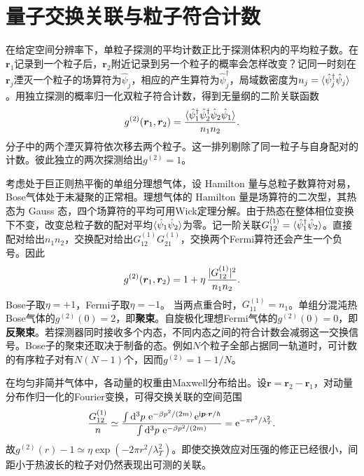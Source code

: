\section{量子交换关联与粒子符合计数}
\label{sec:exchange-correlations}

在给定空间分辨率下，单粒子探测的平均计数正比于探测体积内的平均粒子数。在$\bm r_1$记录到一个粒子后，$\bm r_2$附近记录到另一个粒子的概率会怎样改变？记同一时刻在$\bm r_j$湮灭一个粒子的场算符为$\hat\psi_j$，相应的产生算符为$\hat\psi_j^\dagger$，局域数密度为$n_j = \langle\hat\psi_j^\dagger\hat\psi_j\rangle$。用独立探测的概率归一化双粒子符合计数，得到无量纲的二阶关联函数
\begin{equation}
	g^{(2)}(\bm r_1,\bm r_2) =
	\frac{\langle\hat\psi_1^\dagger\hat\psi_2^\dagger\hat\psi_2\hat\psi_1\rangle}{n_1n_2}.
\end{equation}
分子中的两个湮灭算符依次移去两个粒子。这一排列剔除了同一粒子与自身配对的计数。彼此独立的两次探测给出$g^{(2)} = 1$。

考虑处于巨正则热平衡的单组分理想气体，设 Hamilton 量与总粒子数算符对易，Bose气体处于未凝聚的正常相。理想气体的 Hamilton 量是场算符的二次型，其热态为 Gauss 态，四个场算符的平均可用Wick定理分解。由于热态在整体相位变换下不变，改变总粒子数的配对平均$\langle\hat\psi_1\hat\psi_2\rangle$为零。记一阶关联$G^{(1)}_{12} = \langle\hat\psi_1^\dagger\hat\psi_2\rangle$。直接配对给出$n_1n_2$，交换配对给出$G^{(1)}_{12}G^{(1)}_{21}$，交换两个Fermi算符还会产生一个负号。因此
\begin{equation}
	\label{eqn:exchange coincidences}
	g^{(2)}(\bm r_1,\bm r_2) = 1 + \eta\,\frac{\lvert G^{(1)}_{12}\rvert^2}{n_1n_2}.
\end{equation}
Bose子取$\eta = +1$，Fermi子取$\eta = -1$。
当两点重合时，$G^{(1)}_{11} = n_1$。单组分混沌热Bose气体的$g^{(2)}(0) = 2$，即\textbf{聚束}。自旋极化理想Fermi气体的$g^{(2)}(0) = 0$，即\textbf{反聚束}。若探测器同时接收多个内态，不同内态之间的符合计数会减弱这一交换信号。Bose子的聚束还取决于制备的态。例如$N$个粒子全部占据同一轨道时，可计数的有序粒子对有$N(N - 1)$个，因而$g^{(2)} = 1 - 1/N$。

在均匀非简并气体中，各动量的权重由Maxwell分布给出。设$\bm r = \bm r_2 - \bm r_1$，对动量分布作归一化的Fourier变换，可得交换关联的空间范围
\begin{equation}
	\label{eq:sm-thermal-exchange-range}
	\frac{G^{(1)}_{12}}{n} \simeq
	\frac{\int \mathop{}\!\mathrm{d}^3p\,\mathop{}\!\mathrm{e}^{-\beta p^2/(2m)}\mathop{}\!\mathrm{e}^{\mathrm{i}\bm p\cdot\bm r/\hbar}}
	{\int \mathop{}\!\mathrm{d}^3p\,\mathop{}\!\mathrm{e}^{-\beta p^2/(2m)}} = \mathop{}\!\mathrm{e}^{-\pi r^2/\lambda_T^2}.
\end{equation}
故$g^{(2)}(r) - 1 \simeq \eta\exp(-2\pi r^2/\lambda_T^2)$。即使交换效应对压强的修正已经很小，间距小于热波长的粒子对仍然表现出可测的关联。

